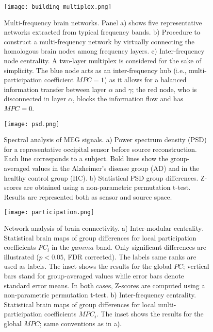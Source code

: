 
\begin{figure}[!ht]
	\centering
	\texttt{[image: building\_multiplex.png]}
	\caption{Multi-frequency brain networks.
	Panel a) shows five representative networks extracted from typical frequency bands.
	b) Procedure to construct a multi-frequency network by virtually connecting the homologous brain nodes among frequency layers.
	c) Inter-frequency node centrality. A two-layer multiplex is considered for the sake of simplicity. The blue node acts as an inter-frequency hub (i.e., multi-participation coefficient $MPC=1$) as it allows for a balanced information transfer between layer $\alpha$ and $\gamma$; the red node, who is disconnected in layer $\alpha$, blocks the information flow and has $MPC=0$.}
	\label{fig:multiplex}
\end{figure}

\newpage
\begin{figure}[!ht]
	\centering
	\texttt{[image: psd.png]}
	\caption{Spectral analysis of MEG signals.
	a) Power spectrum density (PSD) for a representative occipital sensor before source reconstruction. Each line corresponds to a subject. Bold lines show the group-averaged values in the Alzheimer's disease group (AD) and in the healthy control group (HC).
	b) Statistical PSD group differences. Z-scores are obtained using a non-parametric permutation t-test. Results are represented both as sensor and source space.}
	\label{fig:psd}
\end{figure}

\newpage
\begin{figure}[!ht]
	\centering
	\texttt{[image: participation.png]}
	\caption{Network analysis of brain connectivity.
	a) Inter-modular centrality. Statistical brain maps of group differences for local participation coefficients $PC_i$ in the $gamma$ band. Only significant differences are illustrated ($p<0.05$, FDR corrected). The labels same ranks are used as labels. The inset shows the results for the global $PC$; vertical bars stand for group-averaged values while error bars denote standard error means. In both cases, Z-scores are computed using a non-parametric permutation t-test.
	b) Inter-frequency centrality. Statistical brain maps of group differences for local multi-participation coefficients $MPC_i$. The inset shows the results for the global $MPC$; same conventions as in a).}
	\label{fig:participation}
\end{figure}


